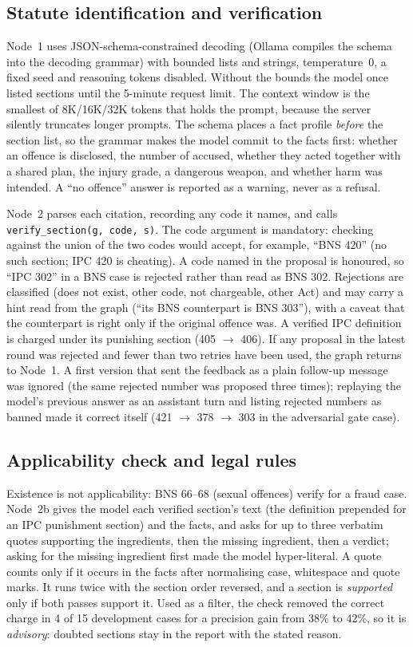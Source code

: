 \documentclass[conference]{IEEEtran}
\begin{document}
\subsection{Statute identification and verification}
Node~1 uses JSON-schema-constrained decoding (Ollama compiles the schema into the decoding grammar) with bounded lists and strings, temperature~0, a fixed seed and reasoning tokens disabled. Without the bounds the model once listed sections until the 5-minute request limit. The context window is the smallest of 8K/16K/32K tokens that holds the prompt, because the server silently truncates longer prompts. The schema places a fact profile \emph{before} the section list, so the grammar makes the model commit to the facts first: whether an offence is disclosed, the number of accused, whether they acted together with a shared plan, the injury grade, a dangerous weapon, and whether harm was intended. A ``no offence'' answer is reported as a warning, never as a refusal.

Node~2 parses each citation, recording any code it names, and calls \texttt{verify\_section(g, code, s)}. The code argument is mandatory: checking against the union of the two codes would accept, for example, ``BNS 420'' (no such section; IPC 420 is cheating). A code named in the proposal is honoured, so ``IPC 302'' in a BNS case is rejected rather than read as BNS 302. Rejections are classified (does not exist, other code, not chargeable, other Act) and may carry a hint read from the graph (``its BNS counterpart is BNS 303''), with a caveat that the counterpart is right only if the original offence was. A verified IPC definition is charged under its punishing section (405 $\rightarrow$ 406). If any proposal in the latest round was rejected and fewer than two retries have been used, the graph returns to Node~1. A first version that sent the feedback as a plain follow-up message was ignored (the same rejected number was proposed three times); replaying the model's previous answer as an assistant turn and listing rejected numbers as banned made it correct itself (421 $\rightarrow$ 378 $\rightarrow$ 303 in the adversarial gate case).

\subsection{Applicability check and legal rules}
Existence is not applicability: BNS 66--68 (sexual offences) verify for a fraud case. Node~2b gives the model each verified section's text (the definition prepended for an IPC punishment section) and the facts, and asks for up to three verbatim quotes supporting the ingredients, then the missing ingredient, then a verdict; asking for the missing ingredient first made the model hyper-literal. A quote counts only if it occurs in the facts after normalising case, whitespace and quote marks. It runs twice with the section order reversed, and a section is \emph{supported} only if both passes support it. Used as a filter, the check removed the correct charge in 4 of 15 development cases for a precision gain from 38\% to 42\%, so it is \emph{advisory}: doubted sections stay in the report with the stated reason.
\end{document}
